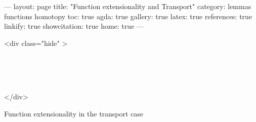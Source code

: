 ---
layout: page
title: "Function extensionality and Transport"
category: lemmas functions homotopy
toc: true
agda: true
gallery: true
latex: true
references: true
linkify: true
showcitation: true
home: true
---

<div class="hide" >
\begin{code}%
\>[0]\AgdaSymbol{\{-\#}\AgdaSpace{}%
\AgdaSpace{}%
\AgdaSpace{}%
\AgdaSymbol{\#-\}}\<%
\\
\>[0]\AgdaSpace{}%
\AgdaSpace{}%
\<%
\\
\>[0]\AgdaSpace{}%
\AgdaSpace{}%
\<%
\\
\>[0]\AgdaSpace{}%
\AgdaSpace{}%
\<%
\end{code}
</div>

Function extensionality in the transport case

\begin{code}%
\>[0]\AgdaSpace{}%
\<%
\\
\>[0][@{}l@{\AgdaIndent{0}}]%
\>[2]\AgdaSymbol{\{}\AgdaSpace{}%
\AgdaSymbol{\}}\AgdaSpace{}%
\AgdaSymbol{\{}\AgdaSpace{}%
\AgdaSymbol{:}\AgdaSpace{}%
\AgdaSpace{}%
\AgdaSymbol{\}}\AgdaSpace{}%
\AgdaSymbol{\{}\AgdaSpace{}%
\AgdaSpace{}%
\AgdaSymbol{:}\AgdaSpace{}%
\AgdaSpace{}%
\AgdaSpace{}%
\AgdaSpace{}%
\AgdaSymbol{\}}\AgdaSpace{}%
\AgdaSymbol{\{}\AgdaSpace{}%
\AgdaSpace{}%
\AgdaSymbol{:}\AgdaSpace{}%
\AgdaSymbol{\}}\AgdaSpace{}%
\<%
\end{code}

